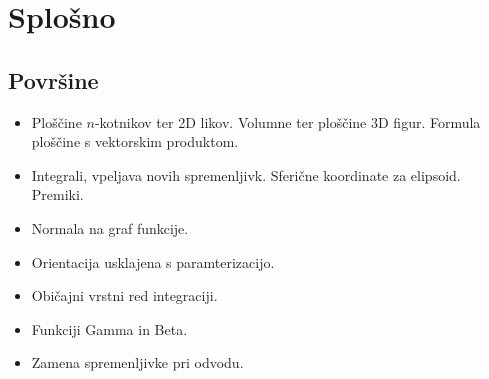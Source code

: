 \section{Splošno}

\subsection{Površine}

\todo{}
\begin{itemize}
    \item Ploščine \(n\)-kotnikov ter 2D likov. Volumne ter ploščine 3D figur. Formula ploščine s vektorskim produktom.
    \item Integrali, vpeljava novih spremenljivk. Sferične koordinate za elipsoid. Premiki.
    \item Normala na graf funkcije.
    \item Orientacija usklajena s paramterizacijo.
    \item Običajni vrstni red integraciji.
    \item Funkciji Gamma in Beta.
    \item Zamena spremenljivke pri odvodu.
\end{itemize}